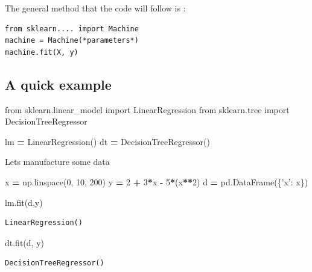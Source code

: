 \documentclass[
  letterpaper,
]{scrbook}
\newenvironment{Shaded}{\begin{snugshade}}{\end{snugshade}}
\newcommand{\DecValTok}[1]{\textcolor[rgb]{0.00,0.00,0.81}{#1}}
\newcommand{\ImportTok}[1]{#1}
\newcommand{\NormalTok}[1]{#1}
\newcommand{\OperatorTok}[1]{\textcolor[rgb]{0.81,0.36,0.00}{\textbf{#1}}}
\newcommand{\StringTok}[1]{\textcolor[rgb]{0.31,0.60,0.02}{#1}}
\begin{document}
The general method that the code will follow is :

\begin{verbatim}
from sklearn.... import Machine
machine = Machine(*parameters*)
machine.fit(X, y)
\end{verbatim}

\hypertarget{a-quick-example}{%
\subsection{A quick example}\label{a-quick-example}}

\begin{Shaded}
\begin{Highlighting}[]
\ImportTok{from}\NormalTok{ sklearn.linear_model }\ImportTok{import}\NormalTok{ LinearRegression}
\ImportTok{from}\NormalTok{ sklearn.tree }\ImportTok{import}\NormalTok{ DecisionTreeRegressor}

\NormalTok{lm }\OperatorTok{=}\NormalTok{ LinearRegression()}
\NormalTok{dt }\OperatorTok{=}\NormalTok{ DecisionTreeRegressor()}
\end{Highlighting}
\end{Shaded}

Lets manufacture some data

\begin{Shaded}
\begin{Highlighting}[]
\NormalTok{x }\OperatorTok{=}\NormalTok{ np.linspace(}\DecValTok{0}\NormalTok{, }\DecValTok{10}\NormalTok{, }\DecValTok{200}\NormalTok{)}
\NormalTok{y }\OperatorTok{=} \DecValTok{2} \OperatorTok{+} \DecValTok{3}\OperatorTok{*}\NormalTok{x }\OperatorTok{-} \DecValTok{5}\OperatorTok{*}\NormalTok{(x}\OperatorTok{**}\DecValTok{2}\NormalTok{)}
\NormalTok{d }\OperatorTok{=}\NormalTok{ pd.DataFrame(\{}\StringTok{'x'}\NormalTok{: x\})}

\NormalTok{lm.fit(d,y)}
\end{Highlighting}
\end{Shaded}

\begin{verbatim}
LinearRegression()
\end{verbatim}

\begin{Shaded}
\begin{Highlighting}[]
\NormalTok{dt.fit(d, y)}
\end{Highlighting}
\end{Shaded}

\begin{verbatim}
DecisionTreeRegressor()
\end{verbatim}
\end{document}
